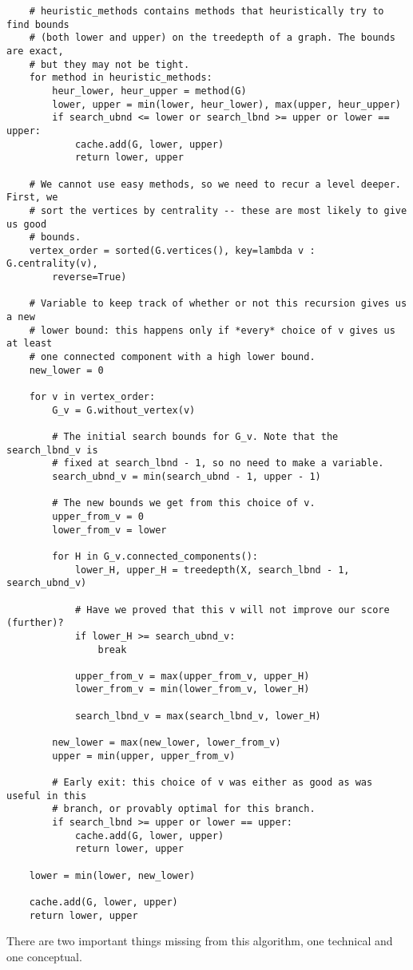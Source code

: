 \documentclass{article}
\theoremstyle{definition}
\begin{document}
\begin{verbatim}
    # heuristic_methods contains methods that heuristically try to find bounds
    # (both lower and upper) on the treedepth of a graph. The bounds are exact,
    # but they may not be tight.
    for method in heuristic_methods:
        heur_lower, heur_upper = method(G)
        lower, upper = min(lower, heur_lower), max(upper, heur_upper)
        if search_ubnd <= lower or search_lbnd >= upper or lower == upper:
            cache.add(G, lower, upper)
            return lower, upper

    # We cannot use easy methods, so we need to recur a level deeper. First, we
    # sort the vertices by centrality -- these are most likely to give us good
    # bounds.
    vertex_order = sorted(G.vertices(), key=lambda v : G.centrality(v),
        reverse=True)

    # Variable to keep track of whether or not this recursion gives us a new
    # lower bound: this happens only if *every* choice of v gives us at least
    # one connected component with a high lower bound.
    new_lower = 0

    for v in vertex_order:
        G_v = G.without_vertex(v)

        # The initial search bounds for G_v. Note that the search_lbnd_v is
        # fixed at search_lbnd - 1, so no need to make a variable.
        search_ubnd_v = min(search_ubnd - 1, upper - 1)

        # The new bounds we get from this choice of v.
        upper_from_v = 0
        lower_from_v = lower

        for H in G_v.connected_components():
            lower_H, upper_H = treedepth(X, search_lbnd - 1, search_ubnd_v)

            # Have we proved that this v will not improve our score (further)?
            if lower_H >= search_ubnd_v:
                break

            upper_from_v = max(upper_from_v, upper_H)
            lower_from_v = min(lower_from_v, lower_H)

            search_lbnd_v = max(search_lbnd_v, lower_H)

        new_lower = max(new_lower, lower_from_v)
        upper = min(upper, upper_from_v)

        # Early exit: this choice of v was either as good as was useful in this
        # branch, or provably optimal for this branch.
        if search_lbnd >= upper or lower == upper:
            cache.add(G, lower, upper)
            return lower, upper

    lower = min(lower, new_lower)

    cache.add(G, lower, upper)
    return lower, upper
\end{verbatim}
There are two important things missing from this algorithm, one technical and
one conceptual.
\end{document}
